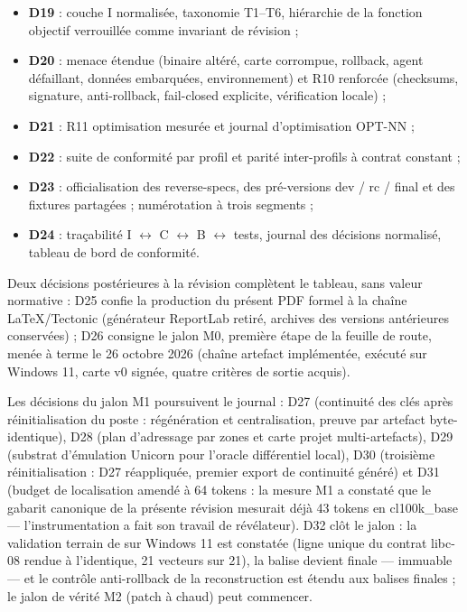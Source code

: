 \begin{itemize}[label={}, leftmargin=1.2em]
\item \textbf{D19} : couche I normalisée, taxonomie T1–T6, hiérarchie de la fonction
objectif verrouillée comme invariant de révision ;
\item \textbf{D20} : menace étendue (binaire altéré, carte corrompue, rollback,
agent défaillant, données embarquées, environnement) et R10 renforcée (checksums,
signature, anti-rollback, fail-closed explicite, vérification locale) ;
\item \textbf{D21} : R11 optimisation mesurée et journal d'optimisation OPT-NN ;
\item \textbf{D22} : suite de conformité par profil et parité inter-profils à contrat
constant ;
\item \textbf{D23} : officialisation des reverse-specs, des pré-versions dev / rc /
final et des fixtures partagées ; numérotation à trois segments ;
\item \textbf{D24} : traçabilité I $\leftrightarrow$ C $\leftrightarrow$ B
$\leftrightarrow$ tests, journal des décisions normalisé, tableau de bord de conformité.
\end{itemize}

Deux décisions postérieures à la révision complètent le tableau, sans valeur
normative : D25 confie la production du présent PDF formel à la chaîne
LaTeX/Tectonic (générateur ReportLab retiré, archives des versions antérieures
conservées) ; D26 consigne le jalon M0, première étape de la feuille de route,
menée à terme le 26 octobre 2026 (chaîne artefact implémentée, 
exécuté sur Windows 11, carte v0 signée, quatre critères de sortie acquis).

Les décisions du jalon M1 poursuivent le journal : D27 (continuité des clés après
réinitialisation du poste : régénération et centralisation, preuve par artefact
byte-identique), D28 (plan d'adressage par zones et carte projet multi-artefacts),
D29 (substrat d'émulation Unicorn pour l'oracle différentiel local), D30 (troisième
réinitialisation : D27 réappliquée, premier export de continuité généré) et D31
(budget de localisation amendé à 64 tokens : la mesure M1 a constaté que le gabarit
canonique de la présente révision mesurait déjà 43 tokens en cl100k\_base —
l'instrumentation a fait son travail de révélateur). D32 clôt le jalon : la
validation terrain de  sur Windows 11 est constatée (ligne unique
du contrat libc-08 rendue à l'identique, 21 vecteurs sur 21), la balise devient
 finale — immuable — et le contrôle anti-rollback de la reconstruction
est étendu aux balises finales ; le jalon de vérité M2 (patch à chaud) peut
commencer.

